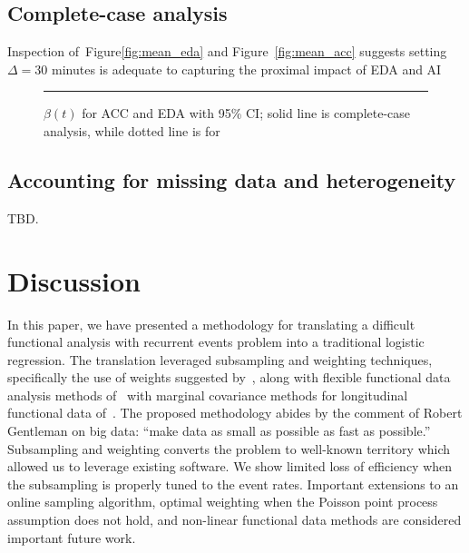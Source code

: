 \documentclass[12pt]{amsart}
\begin{document}
\subsection{Complete-case analysis}

Inspection of~Figure\ref{fig:mean_eda} and Figure~\ref{fig:mean_acc} suggests setting $\Delta = 30$ minutes is adequate to capturing the proximal impact of EDA and AI

\begin{figure}[!th]
\rule{3cm}{3cm}%
\caption{$\beta (t)$ for ACC and EDA with 95\% CI; solid line is complete-case analysis, while dotted line is for }
\label{}
\end{figure}

\subsection{Accounting for missing data and heterogeneity}

TBD.



\section{Discussion}
In this paper, we have presented a methodology for translating a difficult functional analysis with recurrent events problem into a traditional logistic regression.  The translation leveraged subsampling and weighting techniques, specifically the use of weights suggested by~\cite{Waagepetersen2008}, along with flexible functional data analysis methods of~\cite{Goldsmith2011} with marginal covariance methods for longitudinal functional data of~\cite{Park2018}.  The proposed methodology abides by the comment of Robert Gentleman on big data: ``make data as small as possible as fast as possible.''  Subsampling and  weighting converts the problem to well-known territory which allowed us to leverage existing software.  We show limited loss of efficiency when the subsampling is properly tuned to the event rates.  Important extensions to an online sampling algorithm, optimal weighting when the Poisson point process assumption does not hold, and non-linear functional data methods are considered important future work.
\end{document}
